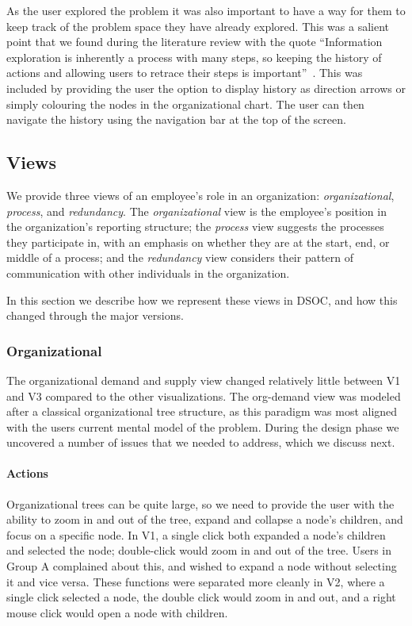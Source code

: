 \documentclass[journal]{vgtc}                %
\begin{document}
As the user explored the problem it was also important to have a way for them to keep track of the problem space they have already explored.  This was a salient point that we found during the literature review with the quote ``Information exploration is inherently a process with many steps, so keeping the history of actions and allowing users to retrace their steps is important''~\cite{anafigueiras}.  This was included by providing the user the option to display history as direction arrows or simply colouring the nodes in the organizational chart.  The user can then navigate the history using the navigation bar at the top of the screen.

\subsection{Views}
We provide three views of an employee's role in an organization: \emph{organizational}, \emph{process}, and \emph{redundancy}. The \emph{organizational} view is the employee's position in the organization's reporting structure; the \emph{process} view suggests the processes they participate in, with an emphasis on whether they are at the start, end, or middle of a process; and the \emph{redundancy} view considers their pattern of communication with other individuals in the organization.

In this section we describe how we represent these views in DSOC, and how this changed through the major versions.

\subsubsection{Organizational}
The organizational demand and supply view changed relatively little between V1 and V3 compared to the other visualizations.  The org-demand view was modeled after a classical organizational tree structure, as this paradigm was most aligned with the users current mental model of the problem.  During the design phase we uncovered a number of issues that we needed to address, which we discuss next.

\paragraph{Actions}
Organizational trees can be quite large, so we need to provide the user with the ability to zoom in and out of the tree, expand and collapse a node's children, and focus on a specific node.  In V1, a single click both expanded a node's children and selected the node; double-click would zoom in and out of the tree.  Users in Group A complained about this, and wished to expand a node without selecting it and vice versa. These functions were separated more cleanly in V2, where a single click selected a node, the double click would zoom in and out, and a right mouse click would open a node with children.
\end{document}
